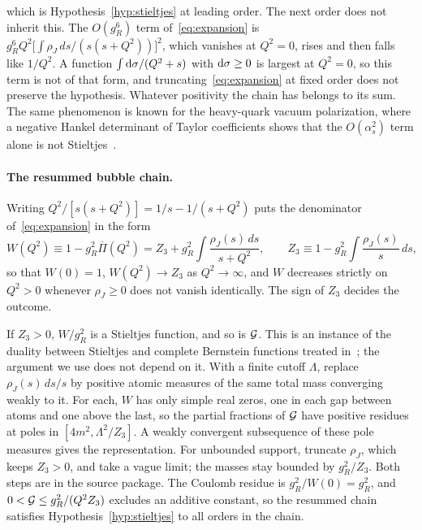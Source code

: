 which is Hypothesis~\ref{hyp:stieltjes} at leading order. The next order does
not inherit this. The $O(g_R^6)$ term of~\eqref{eq:expansion} is
$g_R^6Q^2\bigl[\int\rho_J\,ds/(s(s+Q^2))\bigr]^2$, which vanishes at $Q^2=0$,
rises and then falls like $1/Q^2$. A function $\int\mathrm{d}\sigma/(Q^2+s)$ with
$\mathrm{d}\sigma\ge0$ is largest at $Q^2=0$, so this term is not of that form, and
truncating~\eqref{eq:expansion} at fixed order does not preserve the
hypothesis. Whatever positivity the chain has belongs to its sum. The same
phenomenon is known for the heavy-quark vacuum polarization, where a negative
Hankel determinant of Taylor coefficients shows that the
$O(\alpha_s^2)$ term alone is not Stieltjes~\cite[eqs.~(12)--(14)]{masjuan_peris_2009}.

\paragraph{The resummed bubble chain.}
Writing $Q^2/[s(s+Q^2)]=1/s-1/(s+Q^2)$ puts the denominator
of~\eqref{eq:expansion} in the form
\begin{equation}
W(Q^2)\equiv1-g_R^2\overline{\Pi}(Q^2)
=Z_3+g_R^2\int\frac{\rho_J(s)\,ds}{s+Q^2},
\qquad
Z_3\equiv1-g_R^2\int\frac{\rho_J(s)}{s}\,ds ,
\label{eq:Wpf}
\end{equation}
so that $W(0)=1$, $W(Q^2)\to Z_3$ as $Q^2\to\infty$, and $W$ decreases
strictly on $Q^2>0$ whenever $\rho_J\ge0$ does not vanish identically.
The sign of $Z_3$ decides the outcome.

If $Z_3>0$, $W/g_R^2$ is a Stieltjes function, and so is $\mathcal{G}$. This is an
instance of the duality between Stieltjes and complete Bernstein functions
treated in~\cite{schilling_song_vondracek2012}; the argument we use does not
depend on it. With a finite cutoff $\Lambda$, replace $\rho_J(s)\,ds/s$ by
positive atomic measures of the same total mass converging weakly to it. For
each, $W$ has only simple real zeros, one in each gap between atoms and one
above the last, so the partial fractions of $\mathcal{G}$ have positive residues at
poles in $[4m^2,\Lambda^2/Z_3]$. A weakly convergent subsequence of these pole
measures gives the representation. For unbounded support, truncate $\rho_J$,
which keeps $Z_3>0$, and take a vague limit; the masses stay bounded by
$g_R^2/Z_3$. Both steps are in the source package. The Coulomb residue is
$g_R^2/W(0)=g_R^2$, and $0<\mathcal{G}\le g_R^2/(Q^2Z_3)$ excludes an additive
constant, so the resummed chain satisfies Hypothesis~\ref{hyp:stieltjes} to
all orders in the chain.

